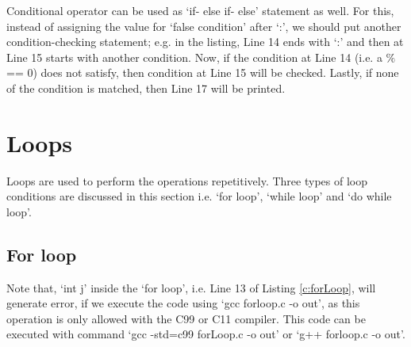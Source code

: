 	
	
	\begin{explanation}
		Conditional operator can be used as `if- else if- else' statement as well. For this, instead of assigning the value for `false condition' after `:', we should put another condition-checking statement; e.g. in the listing, Line 14 ends with `:' and then at Line 15 starts with another condition. Now, if the condition at Line 14 (i.e. a $\%$ == 0) does not satisfy, then condition at Line 15 will be checked. Lastly, if none of the condition is matched, then Line 17 will be printed. 
	\end{explanation}
	
	
\section{Loops}
Loops are used to perform the operations repetitively. Three types of loop conditions are discussed in this section i.e. `for loop', `while loop' and `do while loop'. 
\subsection{For loop}

\begin{noNumBox}
	Note that, `int j' inside the `for loop', i.e. Line  13 of Listing \ref{c:forLoop}, will generate error, if we execute the code using `gcc forloop.c -o out', as this operation is only allowed with the C99 or C11 compiler. This code can be executed with command `gcc -std=c99 forLoop.c -o out' or `g++ forloop.c -o out'. 
\end{noNumBox}

